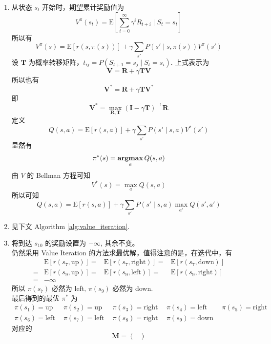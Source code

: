 \documentclass[11pt,letter,notitlepage]{article}
\DeclareMathOperator*{\argmax}{\bf argmax}
\newcommand{\expect}[1]{\text{E} [#1]}
\begin{document}
\begin{solution}
	\begin{enumerate}
		\item  从状态 $s_t$ 开始时，期望累计奖励值为
		      $$V^\pi(s_t)=\expect{\sum_{i=0}^{\infty} \gamma^i R_{t+i} \mid S_t=s_t}$$
		      所以有
		      $$V^\pi(s)=\expect{r(s,\pi(s))}+\gamma \sum_{s'} P(s'\mid s, \pi(s))V^\pi (s')$$
		      设 $\mathbf{T}$ 为概率转移矩阵，$t_{ij}=P(S_{t+1}=s_j \mid S_t=s_i)$. 上式表示为
		      $$\mathbf{V}=\mathbf{R}+\gamma \mathbf{T}\mathbf{V}$$
		      所以也有
		      $$\mathbf{V}^*=\mathbf{R}+\gamma \mathbf{T}\mathbf{V}^*$$
		      即 $$\mathbf{V}^*=\max_{\mathbf{R},\mathbf{T}}(\mathbf{I}-\gamma \mathbf{T})^{-1}\mathbf{R}$$
		      定义
		      $$Q(s,a)=\expect{r(s,a)}+\gamma\sum_{s'}P(s'\mid s,a)V^*(s')$$
		      显然有 $$\pi^*(s)=\argmax_a Q(s,a)$$
		      由 $V$ 的 Bellman 方程可知
		      $$V^*(s)=\max_a Q(s,a)$$
		      所以可知
		      $$Q(s,a)=\expect{r(s,a)}+\gamma \sum_{s'}P(s'\mid s,a)\max_{a'}Q(s',a')$$
		\item 见下文 Algorithm \ref{alg:value_iteration}.
		\item 将到达 $s_{10}$ 的奖励设置为 $-\infty$, 其余不变。\\
		      仍然采用 Value Iteration 的方法求最优解，值得注意的是，在迭代中，有
		      $$\begin{aligned}
				        & \expect{r(s_{7},\text{up})}
				      = & \expect{r(s_{7},\text{right})}
				      = & \expect{r(s_{7},\text{down})}  \\
				      = & \expect{r(s_{9},\text{up})}
				      = & \expect{r(s_{9},\text{left})}
				      = & \expect{r(s_{9},\text{right})} \\
				      = & -\infty
			      \end{aligned}$$
		      所以 $\pi(s_7)$ 必然为 left, $\pi(s_9)$ 必然为 down.\\
		      最后得到的最优 $\pi^*$ 为
		      $$\begin{aligned}
				      \pi(s_1) = \text{up}\ \
				       & \pi(s_2) = \text{up}\ \
				       & \pi(s_3) = \text{right}\ \
				       & \pi(s_4) = \text{left}\ \
				       & \pi(s_5) = \text{right}\  \ \\
				      \pi(s_6) = \text{left}\ \
				       & \pi(s_7) = \text{left}\ \
				       & \pi(s_8) = \text{right}\ \
				       & \pi(s_9) = \text{down}\ \
			      \end{aligned}$$
		      对应的
		      $$\mathbf{M}=\begin{pmatrix}

\end{pmatrix}$$
\end{enumerate}
\end{solution}
\end{document}
